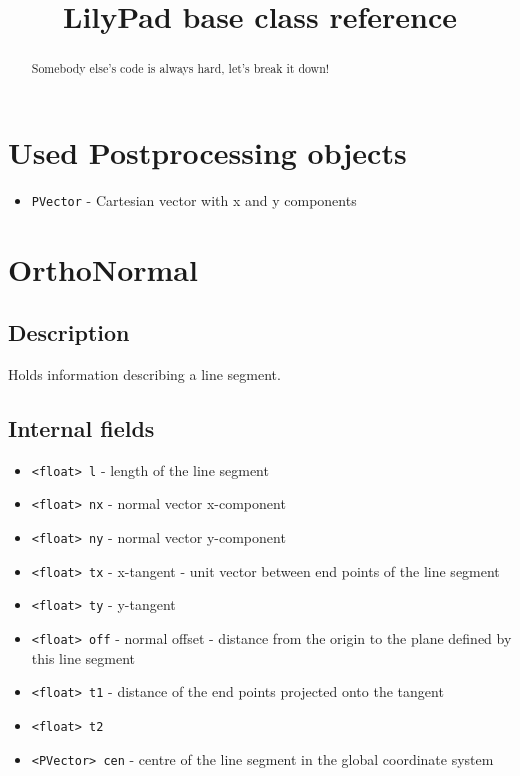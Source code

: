 \documentclass[notitlepage]{article}
\title{LilyPad base class reference}
\begin{document}
\maketitle

\begin{abstract}
Somebody else’s code is always hard, let's break it down!
\end{abstract}

\section{Used Postprocessing objects}

\begin{itemize}
\item \texttt{PVector} - Cartesian vector with x and y components
\end{itemize}

\section{OrthoNormal}

\subsection{Description}

Holds information describing a line segment.

\subsection{Internal fields}

\begin{itemize}
\item \texttt{<float> l} - length of the line segment
\item \texttt{<float> nx} - normal vector x-component
\item \texttt{<float> ny} - normal vector y-component
\item \texttt{<float> tx} - x-tangent - unit vector between end points of the line segment
\item \texttt{<float> ty} - y-tangent
\item \texttt{<float> off} - normal offset - distance from the origin to the plane defined by this line segment
\item \texttt{<float> t1} - distance of the end points projected onto the tangent
\item \texttt{<float> t2}
\item \texttt{<PVector> cen} - centre of the line segment in the global coordinate system
\end{itemize}
\end{document}

